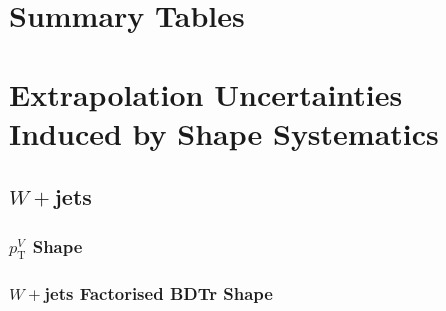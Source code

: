 \section{Summary Tables}



\section{Extrapolation Uncertainties Induced by Shape Systematics}
\subsection{$W+$jets}
\subsubsection{$p_{\mathrm{T}}^V$ Shape}

\subsubsection{$W+$jets Factorised BDTr Shape}

